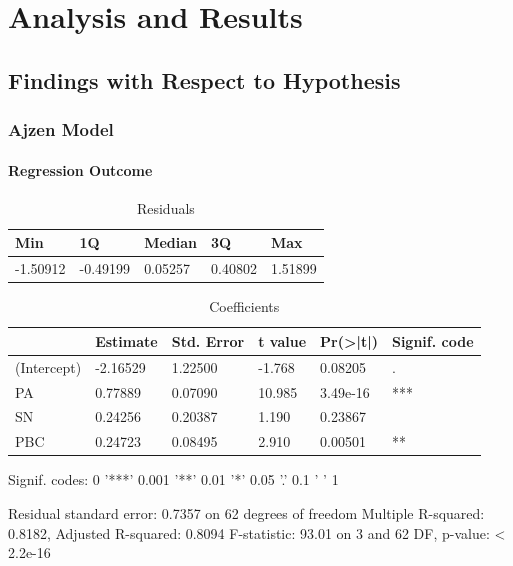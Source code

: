 \chapter{Analysis and Results}\label{chapter:Results}

\section{Findings with Respect to Hypothesis}

\subsection{Ajzen Model}

\subsubsection{Regression Outcome}
\begin{table}[H]
\centering
\caption{Residuals}
\label{Residuals}
\begin{tabular}{@{}lllll@{}}
\toprule
Min      & 1Q       & Median  & 3Q      & Max     \\ \midrule
-1.50912 & -0.49199 & 0.05257 & 0.40802 & 1.51899 \\ \bottomrule
\end{tabular}
\end{table}

\begin{table}[H]
\centering
\caption{Coefficients}
\label{Coefficients}
\begin{tabular}{@{}llllll@{}}
\toprule
            & Estimate & Std. Error & t value & Pr(\textgreater|t|) & Signif. code \\ \midrule
(Intercept) & -2.16529 & 1.22500    & -1.768  & 0.08205             & .            \\
PA          & 0.77889  & 0.07090    & 10.985  & 3.49e-16            & ***          \\
SN          & 0.24256  & 0.20387    & 1.190   & 0.23867             &              \\
PBC         & 0.24723  & 0.08495    & 2.910   & 0.00501             & **           \\ \bottomrule
\end{tabular}
\end{table}

Signif. codes:  0 '***' 0.001 '**' 0.01 '*' 0.05 '.' 0.1 ' ' 1

Residual standard error: 0.7357 on 62 degrees of freedom
Multiple R-squared:  0.8182,	Adjusted R-squared:  0.8094 
F-statistic: 93.01 on 3 and 62 DF,  p-value: < 2.2e-16


